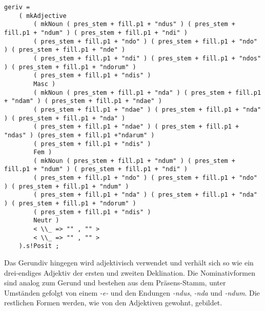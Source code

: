 \begin{lstlisting}[float=h!tp,caption={Ausschnitt aus der Funktion \texttt{mkVerb} um Gerundiv-Verbformen zu bilden (vgl. \textbf{ResLat.gf})},label={GF-Res-MkVerb-Geriv},basicstyle=\small]
      geriv = 
	( mkAdjective
	    ( mkNoun ( pres_stem + fill.p1 + "ndus" ) ( pres_stem + fill.p1 + "ndum" ) ( pres_stem + fill.p1 + "ndi" ) 
		( pres_stem + fill.p1 + "ndo" ) ( pres_stem + fill.p1 + "ndo" ) ( pres_stem + fill.p1 + "nde" ) 
		( pres_stem + fill.p1 + "ndi" ) ( pres_stem + fill.p1 + "ndos" ) ( pres_stem + fill.p1 + "ndorum" ) 
		( pres_stem + fill.p1 + "ndis" ) 
		Masc )
	    ( mkNoun ( pres_stem + fill.p1 + "nda" ) ( pres_stem + fill.p1 + "ndam" ) ( pres_stem + fill.p1 + "ndae" ) 
		( pres_stem + fill.p1 + "ndae" ) ( pres_stem + fill.p1 + "nda" ) ( pres_stem + fill.p1 + "nda" ) 
		( pres_stem + fill.p1 + "ndae" ) ( pres_stem + fill.p1 + "ndas" ) (pres_stem + fill.p1 +"ndarum" ) 
		( pres_stem + fill.p1 + "ndis" ) 
		Fem )
	    ( mkNoun ( pres_stem + fill.p1 + "ndum" ) ( pres_stem + fill.p1 + "ndum" ) ( pres_stem + fill.p1 + "ndi" ) 
		( pres_stem + fill.p1 + "ndo" ) ( pres_stem + fill.p1 + "ndo" ) ( pres_stem + fill.p1 + "ndum" ) 
		( pres_stem + fill.p1 + "nda" ) ( pres_stem + fill.p1 + "nda" ) ( pres_stem + fill.p1 + "ndorum" ) 
		( pres_stem + fill.p1 + "ndis" ) 
		Neutr )
	    < \\_ => "" , "" >
	    < \\_ => "" , "" >
	).s!Posit ;
\end{lstlisting}
Das Gerundiv hingegen wird adjektivisch verwendet und verhält sich so wie ein drei-endiges Adjektiv der ersten und zweiten Deklination. Die Nominativformen sind analog zum Gerund und bestehen aus dem Präsens-Stamm, unter Umständen gefolgt von einem \textit{-e-} und den Endungen \textit{-ndus}, \textit{-nda} und \textit{-ndum}. Die restlichen Formen werden, wie von den Adjektiven gewohnt, gebildet.\par
